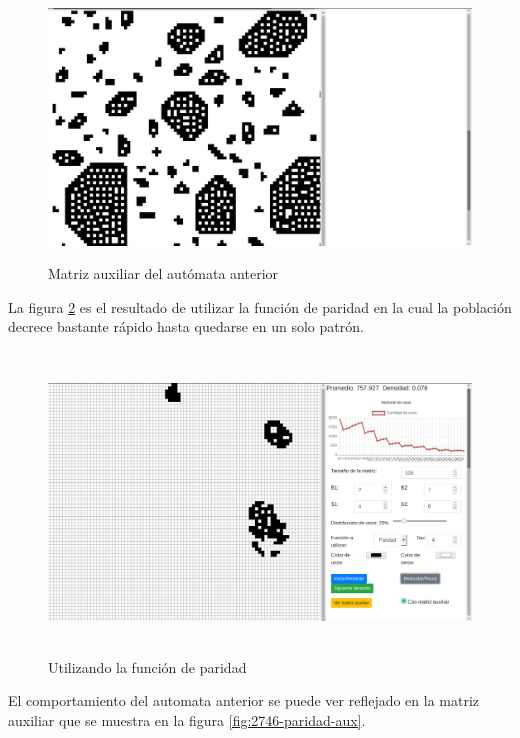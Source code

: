 \documentclass[12pt, titlepage]{article}
\begin{document}
\begin{figure}[H]
\begin{center}
 \includegraphics[width=15cm, height=7cm]{./img/2746-max-aux.png}
 \caption{Matriz auxiliar del autómata anterior}
 \label{fig:2746-max-aux}
\end{center}
\end{figure}
La figura \ref{fig:2746-paridad} es el resultado de utilizar la función de paridad en la cual la población decrece bastante rápido hasta quedarse en un solo patrón.
\begin{figure}[H]
\begin{center}
 \includegraphics[width=15cm, height=8cm]{./img/2746-paridad.png}
 \caption{Utilizando la función de paridad}
 \label{fig:2746-paridad}
\end{center}
\end{figure}
El comportamiento del automata anterior se puede ver reflejado en la matriz auxiliar que se muestra en la figura \ref{fig:2746-paridad-aux}.
\end{document}

